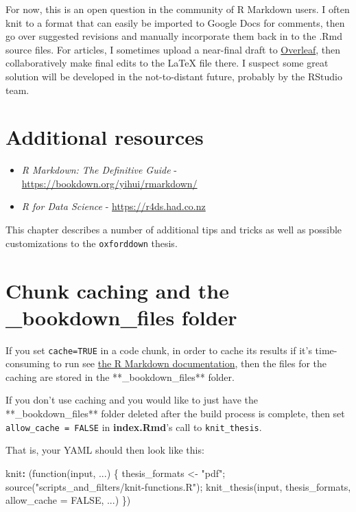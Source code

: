 \documentclass[a4paper, nobind]{templates/ociamthesis}
\newenvironment{Shaded}{\begin{snugshade}}{\end{snugshade}}
\newcommand{\AttributeTok}[1]{\textcolor[rgb]{0.77,0.63,0.00}{#1}}
\newcommand{\FunctionTok}[1]{\textcolor[rgb]{0.00,0.00,0.00}{#1}}
\newcommand{\KeywordTok}[1]{\textcolor[rgb]{0.13,0.29,0.53}{\textbf{#1}}}
\renewenvironment{Shaded}
{
  \vspace{10pt}%
  \begin{snugshade}%
}{%
  \end{snugshade}%
  \vspace{8pt}%
}
\begin{document}
For now, this is an open question in the community of R Markdown users.
I often knit to a format that can easily be imported to Google Docs for comments, then go over suggested revisions and manually incorporate them back in to the .Rmd source files.
For articles, I sometimes upload a near-final draft to \href{https://www.overleaf.com/}{Overleaf}, then collaboratively make final edits to the LaTeX file there.
I suspect some great solution will be developed in the not-to-distant future, probably by the RStudio team.

\hypertarget{additional-resources}{%
\section{Additional resources}\label{additional-resources}}

\begin{itemize}
\item
  \emph{R Markdown: The Definitive Guide} - \url{https://bookdown.org/yihui/rmarkdown/}
\item
  \emph{R for Data Science} - \url{https://r4ds.had.co.nz}
\end{itemize}

\noindent This chapter describes a number of additional tips and tricks as well as possible customizations to the \texttt{oxforddown} thesis.

\hypertarget{chunk-caching-and-the-_bookdown_files-folder}{%
\section{\texorpdfstring{Chunk caching and the \textbf{\_bookdown\_files} folder}{Chunk caching and the \_bookdown\_files folder}}\label{chunk-caching-and-the-_bookdown_files-folder}}

If you set \texttt{cache=TRUE} in a code chunk, in order to cache its results if it's time-consuming to run see \href{https://bookdown.org/yihui/rmarkdown-cookbook/cache.html}{the R Markdown documentation}, then the files for the caching are stored in the **\_bookdown\_files** folder.

If you don't use caching and you would like to just have the **\_bookdown\_files** folder deleted after the build process is complete, then set \texttt{allow\_cache\ =\ FALSE} in \textbf{index.Rmd}'s call to \texttt{knit\_thesis}.

That is, your YAML should then look like this:

\begin{Shaded}
\begin{Highlighting}[]
\FunctionTok{knit}\KeywordTok{:}\AttributeTok{ (function(input, ...) \{}
\AttributeTok{    thesis\_formats \textless{}{-} "pdf";}
\AttributeTok{    }
\AttributeTok{    source("scripts\_and\_filters/knit{-}functions.R");}
\AttributeTok{    knit\_thesis(input, thesis\_formats, allow\_cache = FALSE, ...)}
\AttributeTok{  \})}
\end{Highlighting}
\end{Shaded}
\end{document}
